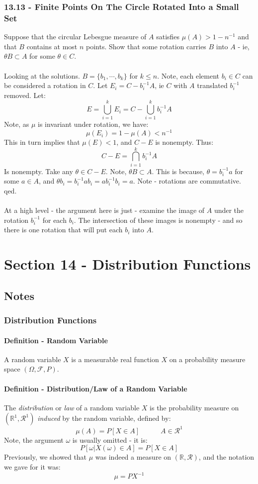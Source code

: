 \documentclass[12pt,a4paper]{article}
\newcommand{\1}[1]{\mathbbm{1}\left\{ #1 \right\}}
\newcommand{\R}{\mathbb{R}}
\newcommand{\fcal}{\mathcal{F}}
\newcommand{\rcal}{\mathcal{R}}
\begin{document}
\subsubsection{13.13 - Finite Points On The Circle Rotated Into a Small Set} Suppose that the circular Lebesgue measure of $A$ satisfies $\mu(A) > 1 - n^{-1}$ and that $B$ contains at most $n$ points. Show that some rotation carries $B$ into $A$ - ie, $\theta B \subset A$ for some $\theta \in C$.
\\\\
Looking at the solutions. $B = \{b_1, \cdots, b_k\}$ for $k \leq n$. Note, each element $b_i \in C$ can be considered a rotation in $C$. Let $E_i = C - b_i^{-1}A$, ie $C$ with $A$ translated $b_i^{-1}$ removed. Let:
$$
	E = \bigcup_{i=1}^k E_i = C - \bigcup_{i=1}^k b_i^{-1}A
$$
Note, as $\mu$ is invariant under rotation, we have:
$$
	\mu(E_i) = 1 - \mu(A) < n^{-1}
$$
This in turn implies that $\mu(E) < 1$, and $C - E$ is nonempty. Thus:
$$
	C - E = \bigcap_{i=1}^k b_i^{-1} A
$$
Is nonempty. Take any $\theta \in C - E$. Note, $\theta B \subset A$. This is because, $\theta = b_i^{-1}a$ for some $a \in A$, and $\theta b_i = b_i^{-1}ab_i = ab_i^{-1}b_i = a$. Note - rotations are commutative. qed.
\\\\
At a high level - the argument here is just - examine the image of $A$ under the rotation $b_i^{-1}$ for each $b_i$. The intersection of these images is nonempty - and so there is one rotation that will put each $b_i$ into $A$.

\section{Section 14 - Distribution Functions}
\subsection{Notes}
\subsubsection{Distribution Functions}
\paragraph{Definition - Random Variable} A random variable $X$ is a measurable real function $X$ on a probability measure space $(\Omega,\fcal,P)$. 

\paragraph{Definition - Distribution/Law of a Random Variable} The \textit{distribution} or \textit{law} of a random variable $X$ is the probability measure on $(\R^1, \rcal^1)$ \textit{induced} by the random variable, defined by:
$$
	\mu(A) = P\left[X \in A\right] \quad\quad\quad A \in \rcal^1
$$
Note, the argument $\omega$ is usually omitted - it is:
$$
	P\left[\omega | X(\omega) \in A\right] = P\left[X \in A\right]
$$
Previously, we showed that $\mu$ was indeed a measure on $(\R,\rcal)$, and the notation we gave for it was:
$$
	\mu = PX^{-1}
$$
\end{document}
